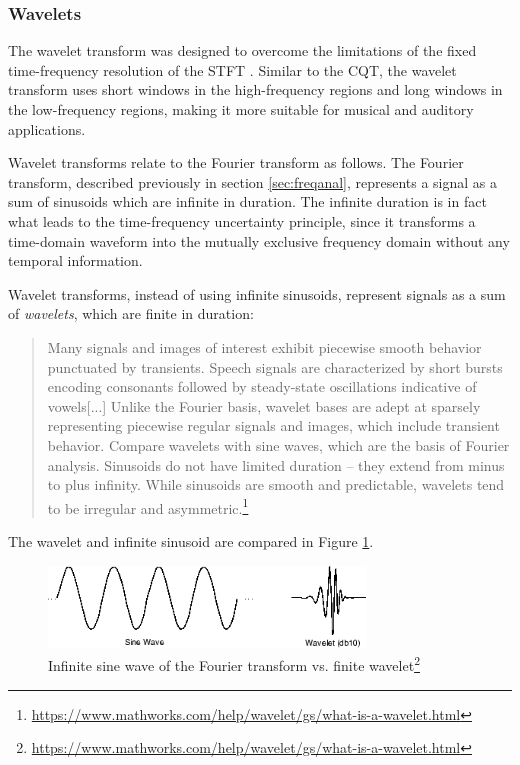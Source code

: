 \documentclass[report.tex]{subfiles}
\begin{document}
\newpagefill

\subsubsection{Wavelets}
\label{sec:wavelets}

The wavelet transform was designed to overcome the limitations of the fixed time-frequency resolution of the STFT \parencite{wavelets1, wavelets2}. Similar to the CQT, the wavelet transform uses short windows in the high-frequency regions and long windows in the low-frequency regions, making it more suitable for musical and auditory applications.

Wavelet transforms relate to the Fourier transform as follows. The Fourier transform, described previously in section \ref{sec:freqanal}, represents a signal as a sum of sinusoids which are infinite in duration. The infinite duration is in fact what leads to the time-frequency uncertainty principle, since it transforms a time-domain waveform into the mutually exclusive frequency domain without any temporal information.

Wavelet transforms, instead of using infinite sinusoids, represent signals as a sum of \textit{wavelets}, which are finite in duration:

\begin{quote}
	Many signals and images of interest exhibit piecewise smooth behavior punctuated by transients. Speech signals are characterized by short bursts encoding consonants followed by steady-state oscillations indicative of vowels[...] Unlike the Fourier basis, wavelet bases are adept at sparsely representing piecewise regular signals and images, which include transient behavior. Compare wavelets with sine waves, which are the basis of Fourier analysis. Sinusoids do not have limited duration -- they extend from minus to plus infinity. While sinusoids are smooth and predictable, wavelets tend to be irregular and asymmetric.\footnote{\url{https://www.mathworks.com/help/wavelet/gs/what-is-a-wavelet.html}}
\end{quote}

 The wavelet and infinite sinusoid are compared in Figure \ref{fig:waveletinf}.

\begin{figure}[ht]
	\centering
        \begin{minipage}{1.\textwidth}
		\renewcommand\footnoterule{} %
		\renewcommand{\thempfootnote}{\fnsymbol{mpfootnote}}
		\includegraphics[width=0.75\textwidth]{./images-wavelets/wavelet.png}
		\caption[Infinite sine wave of the Fourier transform vs. finite wavelet]{Infinite sine wave of the Fourier transform vs. finite wavelet\footnote[1]{\url{https://www.mathworks.com/help/wavelet/gs/what-is-a-wavelet.html}}}
		\label{fig:waveletinf}
	\end{minipage}
\end{figure}
\end{document}
